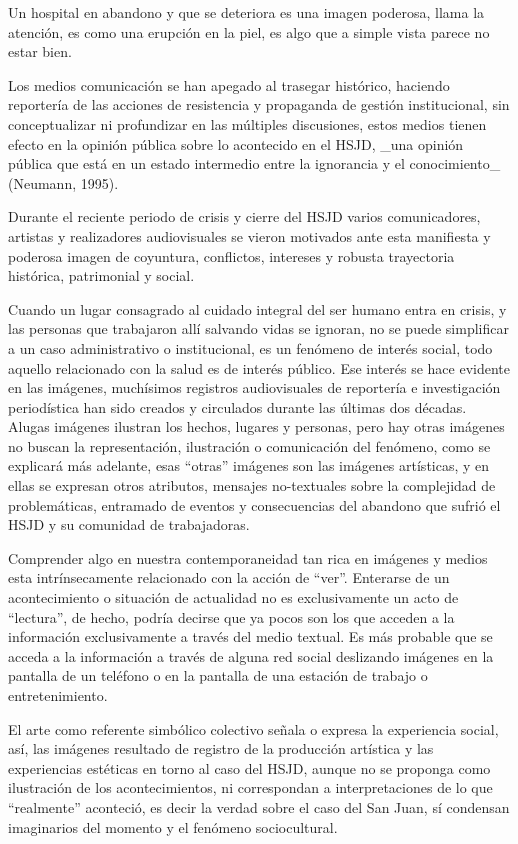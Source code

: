 Un hospital en abandono y que se deteriora es una imagen poderosa, llama la atención, es como una erupción en la piel, es algo que a simple vista parece no estar bien.

Los medios comunicación se han apegado al trasegar histórico, haciendo reportería de las acciones de resistencia y propaganda de gestión institucional, sin conceptualizar ni profundizar en las múltiples discusiones, estos medios tienen efecto en la opinión pública sobre lo acontecido en el HSJD, _una opinión pública que está en un estado intermedio entre la ignorancia y el conocimiento_ (Neumann, 1995).

Durante el reciente periodo de crisis y cierre del HSJD varios comunicadores, artistas y realizadores audiovisuales se vieron motivados ante esta manifiesta y poderosa imagen de coyuntura, conflictos, intereses y robusta trayectoria histórica, patrimonial y social.

Cuando un lugar consagrado al cuidado integral del ser humano entra en crisis, y las personas que trabajaron allí salvando vidas se ignoran, no se puede simplificar a un caso administrativo o institucional, es un fenómeno de interés social, todo aquello relacionado con la salud es de interés público. Ese interés se hace evidente en las imágenes, muchísimos registros audiovisuales de reportería e investigación periodística han sido creados y circulados durante las últimas dos décadas. Alugas imágenes ilustran los hechos, lugares y personas, pero hay otras imágenes no buscan la representación, ilustración o comunicación del fenómeno, como se explicará más adelante, esas “otras” imágenes son las imágenes artísticas, y en ellas se expresan otros atributos, mensajes no-textuales sobre la complejidad de problemáticas, entramado de eventos y consecuencias del abandono que sufrió el HSJD y su comunidad de trabajadoras.

Comprender algo en nuestra contemporaneidad tan rica en imágenes y medios esta intrínsecamente relacionado con la acción de “ver”. Enterarse de un acontecimiento o situación de actualidad no es exclusivamente un acto de “lectura”, de hecho, podría decirse que ya pocos son los que acceden a la información exclusivamente a través del medio textual. Es más probable que se acceda a la información a través de alguna red social deslizando imágenes en la pantalla de un teléfono o en la pantalla de una estación de trabajo o entretenimiento.

El arte como referente simbólico colectivo señala o expresa la experiencia social, así, las imágenes resultado de registro de la producción artística y las experiencias estéticas en torno al caso del HSJD, aunque no se proponga como ilustración de los acontecimientos, ni correspondan a interpretaciones de lo que “realmente” aconteció, es decir la verdad sobre el caso del San Juan, sí condensan imaginarios del momento y el fenómeno sociocultural.

